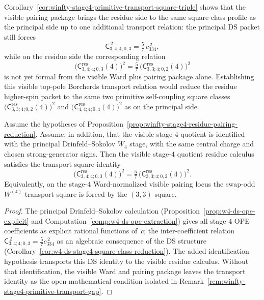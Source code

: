 \begin{remark}
\label{rem:winfty-stage4-primitive-transport-gap}
Corollary~\ref{cor:winfty-stage4-primitive-transport-square-triple}
shows that the visible pairing package brings the residue side to the
same square-class profile as the principal side up to one additional
transport relation: the principal DS packet still forces
\[
\mathsf{C}_{3,4;4;0,3}^{\,2}
=
\tfrac{5}{7}\,c_{334}^{\,2},
\]
while on the residue side the corresponding relation
\[
\bigl(\mathsf{C}^{\mathrm{res}}_{3,4;4;0,3}(4)\bigr)^2
=
\tfrac{5}{7}\,
\bigl(\mathsf{C}^{\mathrm{res}}_{3,3;4;0,2}(4)\bigr)^2
\]
is not yet formal from the visible Ward plus pairing package alone.
Establishing this visible top-pole Borcherds transport relation would
reduce the residue higher-spin packet to the same two primitive
self-coupling square classes
\(
\bigl(\mathsf{C}^{\mathrm{res}}_{3,3;4;0,2}(4)\bigr)^2
\)
and
\(
\bigl(\mathsf{C}^{\mathrm{res}}_{4,4;4;0,4}(4)\bigr)^2
\)
as on the principal side.
\end{remark}

\begin{proposition}
\label{prop:winfty-stage4-visible-borcherds-transport}
\ClaimStatusConditional{}
Assume the hypotheses of
Proposition~\ref{prop:winfty-stage4-residue-pairing-reduction}. Assume,
in addition, that the visible stage-$4$ quotient is identified with the
principal Drinfeld--Sokolov $W_4$ stage, with the same central charge
and chosen strong-generator signs. Then the visible stage-$4$ quotient
residue calculus satisfies the transport square identity
\[
\bigl(\mathsf{C}^{\mathrm{res}}_{3,4;4;0,3}(4)\bigr)^2
=
\tfrac{5}{7}\,
\bigl(\mathsf{C}^{\mathrm{res}}_{3,3;4;0,2}(4)\bigr)^2.
\]
Equivalently, on the stage-$4$ Ward-normalized visible pairing locus
the swap-odd \(W^{(4)}\)-transport square is forced by the
\((3,3)\)-square.
\end{proposition}

\begin{proof}
The principal Drinfeld--Sokolov calculation
(Proposition~\ref{prop:w4-ds-ope-explicit} and
Computation~\ref{comp:w4-ds-ope-extraction}) gives all stage-$4$ OPE
coefficients as explicit rational functions of~$c$;
the inter-coefficient relation
$\mathsf{C}_{3,4;4;0,3}^{\,2} = \tfrac{5}{7}c_{334}^{\,2}$
as an algebraic consequence of the DS structure
(Corollary~\ref{cor:w4-ds-stage4-square-class-reduction}). The added
identification hypothesis transports this DS identity to the visible
residue calculus. Without that identification, the visible Ward and
pairing package leaves the transport identity as the open mathematical condition
isolated in Remark~\ref{rem:winfty-stage4-primitive-transport-gap}.
\end{proof}

